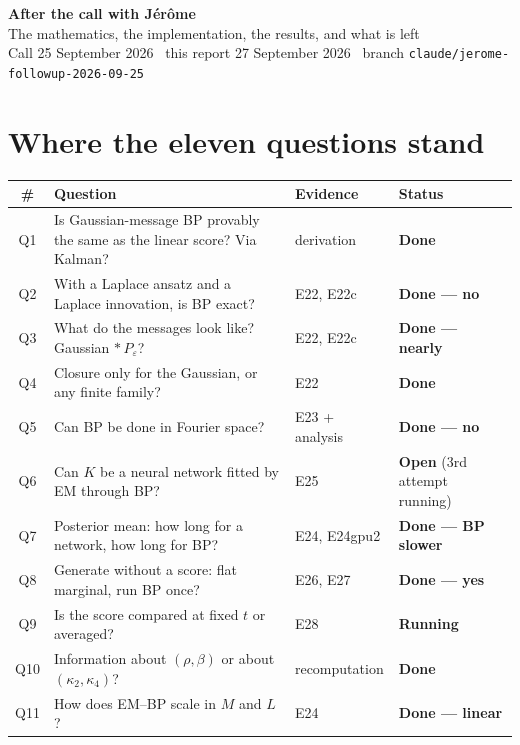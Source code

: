 \documentclass[10pt,a4paper]{article}
\newcommand{\corr}{\rho}
\newcommand{\nsites}{L}
\newcommand{\nseq}{M}
\newcommand{\code}[1]{\texttt{\small #1}}
\newcommand{\st}[1]{\textbf{#1}}
\begin{document}
\begin{center}
{\Large\bfseries After the call with Jérôme}\\[0.25em]
{\normalsize The mathematics, the implementation, the results, and what is left}\\[0.35em]
{\footnotesize Call 25 September 2026 \textperiodcentered\ this report 27 September 2026 \textperiodcentered\ branch
\code{claude/jerome-followup-2026-09-25}}
\end{center}

\vspace{-0.4em}

\section*{Where the eleven questions stand}

\noindent\begin{tabular}{@{}c p{8.6cm} l l@{}}
\toprule
\# & Question & Evidence & Status \\
\midrule
Q1 & Is Gaussian-message BP provably the same as the linear score? Via Kalman? & derivation & \st{Done} \\
Q2 & With a Laplace ansatz and a Laplace innovation, is BP exact? & E22, E22c & \st{Done --- no} \\
Q3 & What do the messages look like? Gaussian $*\,P_\varepsilon$? & E22, E22c & \st{Done --- nearly} \\
Q4 & Closure only for the Gaussian, or any finite family? & E22 & \st{Done} \\
Q5 & Can BP be done in Fourier space? & E23 + analysis & \st{Done --- no} \\
Q6 & Can $K$ be a neural network fitted by EM through BP? & E25 & \st{Open} (3rd attempt running) \\
Q7 & Posterior mean: how long for a network, how long for BP? & E24, E24gpu2 & \st{Done --- BP slower} \\
Q8 & Generate without a score: flat marginal, run BP once? & E26, E27 & \st{Done --- yes} \\
Q9 & Is the score compared at fixed $t$ or averaged? & E28 & \st{Running} \\
Q10 & Information about $(\corr,\beta)$ or about $(\kappa_2,\kappa_4)$? & recomputation & \st{Done} \\
Q11 & How does EM--BP scale in $\nseq$ and $\nsites$? & E24 & \st{Done --- linear} \\
\bottomrule
\end{tabular}
\end{document}
